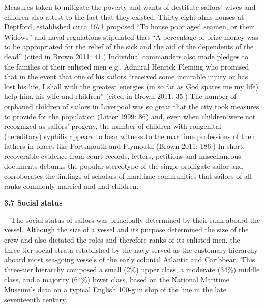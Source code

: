 \begin{styleStandard}
Measures taken to mitigate the poverty and wants of destitute sailors’ wives and children also attest to the fact that they existed. Thirty-eight alms houses at Deptford, established circa 1671 proposed “To house poor aged seamen, or their Widows” and naval regulations stipulated that “A percentage of prize money was to be appropriated for the relief of the sick and the aid of the dependents of the dead” (cited in Brown 2011: 41.) Individual commanders also made pledges to the families of their enlisted men e.g., Admiral Henrick Fleming who promised that in the event that one of his sailors “received some incurable injury or has lost his life, I shall with the greatest energies (in so far as God spares me my life) help him, his wife and children” (cited in Brown 2011: 35.) The number of orphaned children of sailors in Liverpool was so great that the city took measures to provide for the population (Litter 1999: 86) and, even when children were not recognized as sailors’ progeny, the number of children with congenital (hereditary) syphilis appears to bear witness to the maritime professions of their fathers in places like Portsmouth and Plymouth (Brown 2011: 186.) In short, recoverable evidence from court records, letters, petitions and miscellaneous documents debunks the popular stereotype of the single profligate sailor and corroborates the findings of scholars of maritime communities that sailors of all ranks commonly married and had children. 
\end{styleStandard}

\begin{styleStandard}
\textbf{3.7 Social status}
\end{styleStandard}

\begin{styleStandard}
\ \ The social status of sailors was principally determined by their rank aboard the vessel. Although the size of a vessel and its purpose determined the size of the crew and also dictated the roles and therefore ranks of its enlisted men, the three-tier social strata established by the navy served as the customary hierarchy aboard most sea-going vessels of the early colonial Atlantic and Caribbean. This three-tier hierarchy composed a small (2\%) upper class, a moderate (34\%) middle class, and a majority (64\%) lower class, based on the National Maritime Museum’s data on a typical English 100-gun ship of the line in the late seventeenth century. 
\end{styleStandard}

